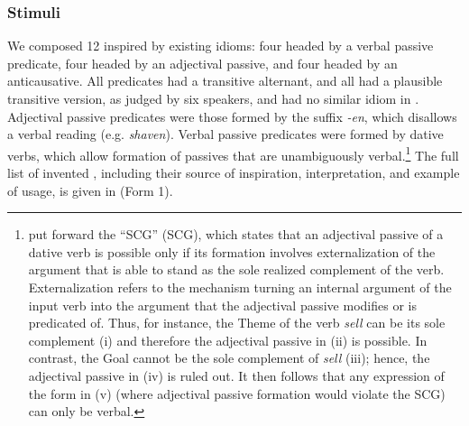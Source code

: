 \documentclass[output=paper]{langsci/langscibook}
\begin{document}
\subsubsection{Stimuli} 
We composed 12   inspired by existing
 idioms: four headed by a verbal passive predicate,
four headed by an
adjectival passive, and four headed by an anticausative. All predicates had a
transitive alternant, and all  had a plausible transitive version,
as judged by six speakers, and had no similar idiom in . Adjectival
passive predicates were those formed by the suffix \emph{-en}, which disallows
a verbal reading (e.g. \emph{shaven}). Verbal passive predicates were formed
by dative verbs, which allow formation of passives that are unambiguously
verbal.{\footnote{\textcite{LevRap1986} put forward the \enquote{\glsdesc{SCG}}
    (\gls{SCG}), which states that an adjectival passive of a
    dative verb is possible only if its formation involves externalization of
    the argument that is able to stand as the sole realized complement of the
    verb.  Externalization refers to the mechanism turning an internal argument
    of the input verb into the argument that the adjectival passive modifies or
    is predicated of.  Thus, for instance, the Theme of the verb \emph{sell}
    can be its sole complement (i) and therefore the adjectival passive in (ii)
    is possible. In contrast, the Goal cannot be the sole complement of
    \emph{sell} (iii); hence, the adjectival passive in (iv) is ruled out. It
    then follows that any expression of the form in (v) (where adjectival
    passive formation would violate the \gls{SCG}) can only be verbal.

   \z}} The full list of invented , including their 
    source of inspiration, interpretation, and example of usage, is given in
     (Form 1).
\end{document}

